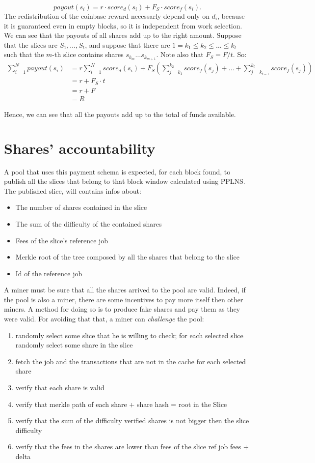 \documentclass[11pt]{article}
\begin{document}
\[payout(s_i) = r\cdot score_d(s_i) + F_S \cdot score_f(s_i).\]
 The redistribution of the coinbase reward necessarly depend only on $d_i$, because it is guaranteed even in empty blocks, so it is independent from work selection.
We can see that the payouts of all shares add up to the right amount. Suppose that the slices are $S_1, \dots, S_t$, and suppose that there are $1=k_1\le k_2\le \dots \le k_t$ such that the $m$-th slice contains shares $s_{k_m} \dots s_{k_{m+1}}$. Note also that $F_S = F/t$. So:
\begin{align*} 
\sum_{i=1} ^N payout(s_i) &= r\sum_{i=1}^N score_d(s_i) +F_{S}\left(\sum_{j=k_1}^{k_2} score_f(s_j)+\dots +\sum_{j=k_{t-1}}^{k_t} score_f(s_j)\right) \\
&= r +F_S\cdot t\\ &= r+F \\ &= R
\end{align*}

Hence, we can see that all the payouts add up to the total of funds available.

\section{Shares' accountability}
A pool that uses this payment schema is expected, for each block found, to publish all the slices
that belong to that block window calculated using PPLNS. The published slice, will contains infos
about:
\begin{itemize}
	\item The number of shares contained in the slice
	\item The sum of the difficulty of the contained shares
	\item Fees of the slice's reference job
	\item Merkle root of the tree composed by all the shares that belong to the slice
	\item Id of the reference job
\end{itemize}
A miner must be sure that all the shares arrived to the pool are valid. Indeed, if the pool is also a miner, there are some incentives to pay more itself then other miners. A method for doing so is to produce fake shares and pay them as they were valid. For avoiding that that, a miner can \emph{challenge} the pool:
\begin{enumerate}
	\item randomly select some slice that he is willing to check; for each selected slice randomly select some share in the slice
	\item fetch the job and the transactions that are not in the cache for each selected share
	\item verify that each share is valid
	\item verify that merkle path of each share + share hash = root in the Slice
	\item verify that the sum of the difficulty verified shares is not bigger then the slice difficulty
	\item verify that the fees in the shares are lower than fees of the slice ref job fees + delta
	
\end{enumerate}
 
\end{document}
